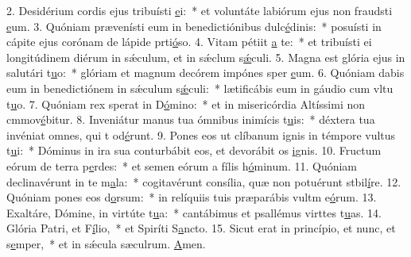 2. Desidérium cordis ejus tribuísti \uline{e}i:~* et voluntáte labiórum ejus non fraudsti \uline{e}um.
3. Quóniam prævenísti eum in benedictiónibus dulc\uline{é}dinis:~* posuísti in cápite ejus corónam de lápide prti\uline{ó}so.
4. Vitam pétiit \uline{a} te:~* et tribuísti ei longitúdinem diérum in sǽculum, et in sǽclum s\uline{ǽ}culi.
5. Magna est glória ejus in salutári t\uline{u}o:~* glóriam et magnum decórem impónes sper \uline{e}um.
6. Quóniam dabis eum in benedictiónem in sǽculum s\uline{ǽ}culi:~* lætificábis eum in gáudio cum vltu t\uline{u}o.
7. Quóniam rex sperat in D\uline{ó}mino:~* et in misericórdia Altíssimi non cmmov\uline{é}bitur.
8. Inveniátur manus tua ómnibus inimícis t\uline{u}is:~* déxtera tua invéniat omnes, qui t od\uline{é}runt.
9. Pones eos ut clíbanum ignis in témpore vultus t\uline{u}i:~* Dóminus in ira sua conturbábit eos, et devorábit os \uline{i}gnis.
10. Fructum eórum de terra p\uline{e}rdes:~* et semen eórum a fílis h\uline{ó}minum.
11. Quóniam declinavérunt in te m\uline{a}la:~* cogitavérunt consília, quæ non potuérunt stbil\uline{í}re.
12. Quóniam pones eos d\uline{o}rsum:~* in relíquiis tuis præparábis vultm e\uline{ó}rum.
13. Exaltáre, Dómine, in virtúte t\uline{u}a:~* cantábimus et psallémus virttes t\uline{u}as.
14. Glória Patri, et F\uline{í}lio,~* et Spiríti S\uline{a}ncto.
15. Sicut erat in princípio, et nunc, et s\uline{e}mper,~* et in sǽcula sæculrum. \uline{A}men.
